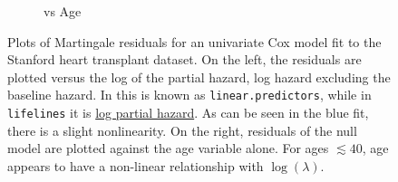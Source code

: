\begin{figure}[H]
\begin{subfigure}[c]{0.48\textwidth}
  \caption{vs Age}
  \label{fig:cox:martingale_residuals:age}
  \end{subfigure}
\caption{
Plots of Martingale residuals for
an univariate Cox model fit to the Stanford heart transplant dataset.
On the left, the residuals are plotted versus the
log of the partial hazard, \ie log hazard excluding the baseline hazard.
In \R this is known as \texttt{linear.predictors}, while in \texttt{lifelines} it is
\href{https://lifelines.readthedocs.io/en/latest/fitters/regression/CoxPHFitter.html\#lifelines.fitters.coxph_fitter.SemiParametricPHFitter.predict_log_partial_hazard}{log partial hazard}.
As can be seen in the blue fit, there is a slight nonlinearity.
On the right, residuals of the null model are plotted against the age variable alone.
For ages $\lesssim 40$, age appears to have a non-linear relationship with $\log\left(\lambda\right)$.
}
\label{fig:cox:martingale_residuals}
\end{figure}

